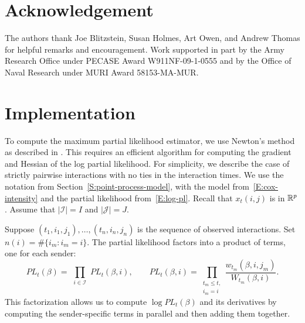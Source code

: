 \documentclass[final]{statsoc}
\begin{document}
\section*{Acknowledgement}

The authors thank Joe Blitzstein, Susan Holmes, Art Owen, and Andrew Thomas
for helpful remarks and encouragement.
Work supported in part by the Army Research Office under
PECASE Award W911NF-09-1-0555 and by the Office of Naval
Research under MURI Award 58153-MA-MUR.


\appendix

\section{Implementation}\label{S:implementation}

To compute the maximum partial likelihood estimator, we use Newton's
method as described in \citet{boyd2004convex}.
This requires an efficient algorithm for
computing the gradient and Hessian of the log partial likelihood.  For
simplicity, we describe the case of strictly pairwise interactions with no
ties in the interaction times.  We use the notation from
Section~\ref{S:point-process-model}, with
the model from~\eqref{E:cox-intensity} and the partial likelihood
from~\eqref{E:log-pl}.  Recall that $x_t(i,j)$ is in $\mathbb{R}^p$.
Assume that $|\mathcal{I}| = I$ and $|\mathcal{J}| = J$.

Suppose $(t_1, i_1, j_1), \ldots, (t_n, i_n, j_n)$ is the sequence of observed
interactions.  Set $n(i) = \#\{ i_m : i_m = i \}.$
The partial likelihood factors into a product of terms, one for each sender:
\begin{equation*}
    \mathit{PL}_t(\beta)
        =
        \,\,
        \prod_{i \in \mathcal{I}}
            \,\,
            \mathit{PL}_t(\beta, i),
    \qquad
    \mathit{PL}_t(\beta, i)
        =
        \!\!\!\!
        \prod_{\substack{t_m \leq t, \\ i_m = i}}
            \!\!\!
            \frac{w_{t_m} (\beta, i, j_m)}
                 {W_{t_m}(\beta, i)}.
\end{equation*}
This factorization allows us to compute $\log \mathit{PL}_t(\beta)$ and
its derivatives by computing the sender-specific terms in parallel and
then adding them together.
\end{document}
